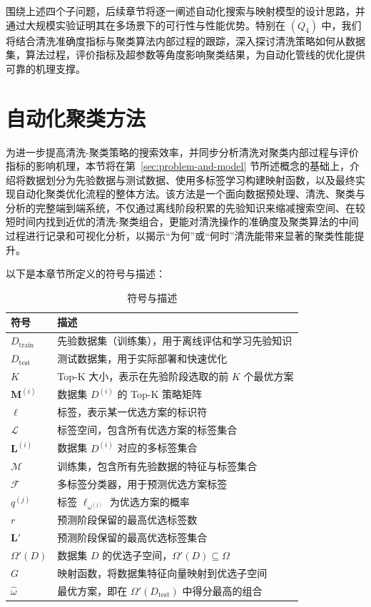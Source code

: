 \documentclass[10pt]{article} %
\numberwithin{equation}{section}
\begin{document}
围绕上述四个子问题，后续章节将逐一阐述自动化搜索与映射模型的设计思路，并通过大规模实验证明其在多场景下的可行性与性能优势。特别在 \((Q_4)\) 中，我们将结合清洗准确度指标与聚类算法内部过程的跟踪，深入探讨清洗策略如何从数据集，算法过程，评价指标及超参数等角度影响聚类结果，为自动化管线的优化提供可靠的机理支撑。



\section{自动化聚类方法}
\label{sec:autoML}

为进一步提高清洗-聚类策略的搜索效率，并同步分析清洗对聚类内部过程与评价指标的影响机理，本节将在第~\ref{sec:problem-and-model} 节所述概念的基础上，介绍将数据划分为先验数据与测试数据、使用多标签学习构建映射函数，以及最终实现自动化聚类优化流程的整体方法。该方法是一个面向数据预处理、清洗、聚类与分析的完整端到端系统，不仅通过离线阶段积累的先验知识来缩减搜索空间、在较短时间内找到近优的清洗-聚类组合，更能对清洗操作的准确度及聚类算法的中间过程进行记录和可视化分析，以揭示“为何”或“何时”清洗能带来显著的聚类性能提升。

以下是本章节所定义的符号与描述：

\begin{table}[ht]
\centering
\small %
\renewcommand{\arraystretch}{1.1} %
\label{tab:symbols-advanced}
\begin{tabular}{ll}
\toprule
\textbf{符号} & \textbf{描述} \\
\midrule
$D_{\text{train}}$ & 先验数据集（训练集），用于离线评估和学习先验知识 \\
$D_{\text{test}}$ & 测试数据集，用于实际部署和快速优化 \\
$K$ & Top-K 大小，表示在先验阶段选取的前 $K$ 个最优方案 \\
$\mathbf{M}^{(i)}$ & 数据集 $D^{(i)}$ 的 Top-K 策略矩阵 \\
$\ell$ & 标签，表示某一优选方案的标识符 \\
$\mathcal{L}$ & 标签空间，包含所有优选方案的标签集合 \\
$\mathbf{L}^{(i)}$ & 数据集 $D^{(i)}$ 对应的多标签集合 \\
$\mathcal{M}$ & 训练集，包含所有先验数据的特征与标签集合 \\
$\mathcal{F}$ & 多标签分类器，用于预测优选方案标签 \\
$q^{(j)}$ & 标签 $\ell_{\omega^{(j)}}$ 为优选方案的概率 \\
$r$ & 预测阶段保留的最高优选标签数 \\
$\mathbf{L}'$ & 预测阶段保留的最高优选标签集合 \\
$\Omega'(D)$ & 数据集 $D$ 的优选子空间，$\Omega'(D) \subseteq \Omega$ \\
$G$ & 映射函数，将数据集特征向量映射到优选子空间 \\
$\hat{\omega}$ & 最优方案，即在 $\Omega'(D_{\text{test}})$ 中得分最高的组合 \\
\bottomrule
\end{tabular}
\caption{符号与描述}
\end{table}
\end{document}
